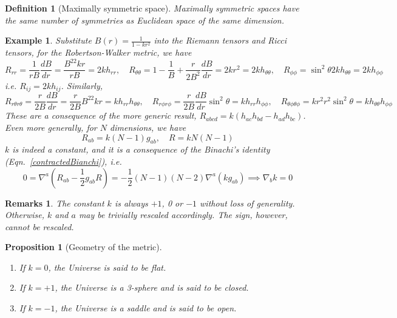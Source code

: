 \documentclass[a4paper]{article}
\newtheorem{eg}{Example}[section]
\newtheorem{remarks}{Remarks}[section]
\theoremstyle{new}
\newtheorem{defi}{Definition}[section]
\newtheorem{prop}{Proposition}[section]
\begin{document}
\begin{defi}[Maximally symmetric space]
Maximally symmetric spaces have the same number of symmetries as Euclidean space of the same dimension.
\end{defi}
\begin{eg}
Substitute $B(r)=\frac{1}{1-kr^2}$ into the Riemann tensors and Ricci tensors, for the Robertson-Walker metric, we have
\begin{equation}
R_{rr}=\frac{1}{rB}\frac{dB}{dr}=\frac{B^22kr}{rB}=2kh_{rr},\quad R_{\theta\theta}=1-\frac{1}{B}+\frac{r}{2B^2}\frac{dB}{dr}=2kr^2=2kh_{\theta\theta},\quad R_{\phi\phi}=\sin^2\theta 2kh_{\theta\theta}=2kh_{\phi\phi}\label{maximallysymmetric}
\end{equation}
i.e. $R_{ij}=2kh_{ij}$. Similarly,
$$R_{r\theta r\theta}=\frac{r}{2B}\frac{dB}{dr}=\frac{r}{2B}B^22kr=kh_{rr}h_{\theta\theta},\quad R_{r\phi r\phi}=\frac{r}{2B}\frac{dB}{dr}\sin^2\theta=kh_{rr}h_{\phi\phi},\quad R_{\theta\phi\theta\phi}=kr^2r^2\sin^2\theta=kh_{\theta\theta}h_{\phi\phi}$$
These are a consequence of the more generic result, $R_{abcd}=k(h_{ac}h_{bd}-h_{ad}h_{bc})$. Even more generally, for $N$ dimensions, we have
$$R_{ab}=k(N-1)g_{ab},\quad R=kN(N-1)$$
$k$ is indeed a constant, and it is a consequence of the Binachi's identity (Eqn.~\ref{contractedBianchi}), i.e.
$$0=\nabla^a(R_{ab}-\frac{1}{2}g_{ab}R)=-\frac{1}{2}(N-1)(N-2)\nabla^a(kg_{ab})\implies\nabla_bk=0$$
\end{eg}
\begin{remarks}
The constant $k$ is always $+1$, 0 or $-1$ without loss of generality. Otherwise, $k$ and $a$ may be trivially rescaled accordingly. The sign, however, cannot be rescaled.
\end{remarks}
\begin{prop}[Geometry of the metric]\leavevmode
\begin{enumerate}
    \item If $k=0$, the Universe is said to be flat.
    \item If $k=+1$, the Universe is a 3-sphere and is said to be closed.
    \item If $k=-1$, the Universe is a saddle and is said to be open.
\end{enumerate}
\end{prop}
\end{document}
